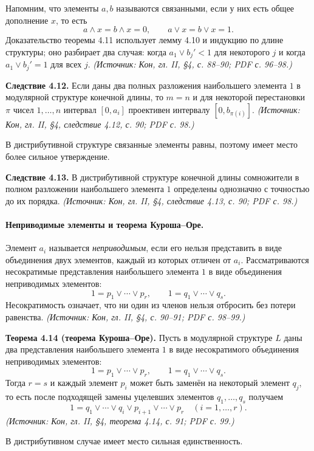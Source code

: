 \documentclass[a4paper,12pt]{article}
\begin{document}
Напомним, что элементы \(a,b\) называются связанными, если у них есть общее дополнение \(x\), то есть
\[
a\wedge x=b\wedge x=0,\qquad
a\vee x=b\vee x=1.
\]
Доказательство теоремы 4.11 использует лемму 4.10 и индукцию по длине структуры; оно разбирает два случая: когда \(a_1\vee b_j'<1\) для некоторого \(j\) и когда \(a_1\vee b_j'=1\) для всех \(j\).
\textit{(Источник: Кон, гл. II, §4, с. 88--90; PDF с. 96--98.)}

\textbf{Следствие 4.12.} Если даны два полных разложения наибольшего элемента \(1\) в модулярной структуре конечной длины, то \(m=n\) и для некоторой перестановки \(\pi\) чисел \(1,\ldots,n\) интервал \([0,a_i]\) проективен интервалу \([0,b_{\pi(i)}]\).
\textit{(Источник: Кон, гл. II, §4, следствие 4.12, с. 90; PDF с. 98.)}

В дистрибутивной структуре связанные элементы равны, поэтому имеет место более сильное утверждение.

\textbf{Следствие 4.13.} В дистрибутивной структуре конечной длины сомножители в полном разложении наибольшего элемента \(1\) определены однозначно с точностью до их порядка.
\textit{(Источник: Кон, гл. II, §4, следствие 4.13, с. 90; PDF с. 98.)}

\paragraph{Неприводимые элементы и теорема Куроша--Оре.}
Элемент \(a_i\) называется \emph{неприводимым}, если его нельзя представить в виде объединения двух элементов, каждый из которых отличен от \(a_i\). Рассматриваются несократимые представления наибольшего элемента \(1\) в виде объединения неприводимых элементов:
\[
1=p_1\vee\cdots\vee p_r,
\qquad
1=q_1\vee\cdots\vee q_s.
\]
Несократимость означает, что ни один из членов нельзя отбросить без потери равенства.
\textit{(Источник: Кон, гл. II, §4, с. 90--91; PDF с. 98--99.)}

\textbf{Теорема 4.14 (теорема Куроша--Оре).} Пусть в модулярной структуре \(L\) даны два представления наибольшего элемента \(1\) в виде несократимого объединения неприводимых элементов:
\[
1=p_1\vee\cdots\vee p_r,
\qquad
1=q_1\vee\cdots\vee q_s.
\]
Тогда \(r=s\) и каждый элемент \(p_i\) может быть заменён на некоторый элемент \(q_j\), то есть после подходящей замены уцелевших элементов \(q_1,\ldots,q_s\) получаем
\[
1=q_1\vee\cdots\vee q_i\vee p_{i+1}\vee\cdots\vee p_r
\quad(i=1,\ldots,r).
\]
\textit{(Источник: Кон, гл. II, §4, теорема 4.14, с. 91; PDF с. 99.)}

В дистрибутивном случае имеет место сильная единственность.
\end{document}
